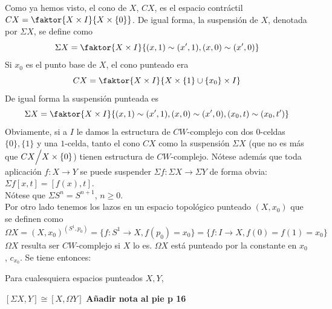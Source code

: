 Como ya hemos visto, el cono de $X$, $CX$, es el espacio contráctil $CX = \faktor{X \times I }{X \times \{ 0 \}}$. De igual forma, la suspensión de $X$, denotada por $\Sigma X$, se define como
\[ \Sigma X =  \faktor{X \times I}{ (x, 1) \sim (x', 1), (x, 0) \sim (x', 0)} \] Si $x_0$ es el punto base de $X$, el cono punteado era
\[ CX = \faktor{X \times I}{X \times \{ 1 \}  \cup \{ x_0 \} \times I}\]
De igual forma la suspensión punteada es 
\[ \Sigma X = \faktor{ X \times I }{ (x, 1) \sim (x', 1), (x, 0) \sim (x', 0), (x_0, t) \sim (x_0, t')} \]
Obviamente, si a $I$ le damos la estructura de $CW$-complejo con dos $0$-celdas $\{0\}, \{1\}$ y una $1$-celda, tanto el cono $CX$ como la suspensión $\Sigma X$ (que no es más que $CX \Bign/ X \times \{ 0 \}$) tienen estructura de $CW$-complejo. Nótese además que toda aplicación $f : X \rightarrow Y$ se puede suspender $\Sigma f : \Sigma X \rightarrow \Sigma Y$ de forma obvia:
$\Sigma f [x, t] = [f(x), t]$.\\
Nótese que $\Sigma S^n = S^{n+1}$, $n \geq 0$.\\
Por otro lado tenemos los lazos en un espacio topológico punteado $(X, x_0)$ que se definen como
\[
\Omega X = (X, x_0)^{(S^1, p_0)} = \{ f : S^1 \rightarrow X, f(p_0) = x_0 \} = \{ f : I \rightarrow X, f(0) = f(1) = x_0 \}
\]
$\Omega X$ resulta ser $CW$-complejo si $X$ lo es. $\Omega X$ está punteado por la constante en $x_0$, $c_{x_0}$. Se tiene entonces:
\begin{teor}
Para cualesquiera espacios punteados $X, Y$,
\begin{center}
$[\Sigma X, Y ] \cong [X, \Omega Y]$ \textbf{Añadir nota al pie p 16}
\end{center}
\end{teor}
